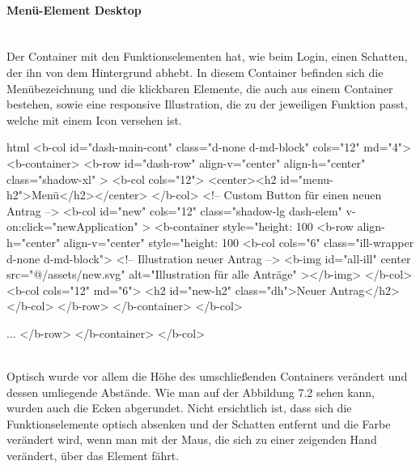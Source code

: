 \paragraph{Menü-Element Desktop}
~\\
Der Container mit den Funktionselementen hat, wie beim Login, einen Schatten, der ihn von dem Hintergrund abhebt. In diesem Container befinden sich die Menübezeichnung und die klickbaren Elemente, die auch aus einem Container bestehen, sowie eine responsive Illustration, die zu der jeweiligen Funktion passt, welche mit einem Icon versehen ist. 
\begin{code}{html}
<b-col id="dash-main-cont" class="d-none d-md-block" cols="12" md="4">
	<b-container>
		<b-row
			id="dash-row"
			align-v="center"
			align-h="center"
			class="shadow-xl"
		>
			<b-col cols="12">
				<center><h2 id="menu-h2">Menü</h2></center>
			</b-col>
			<!-- Custom Button für einen neuen Antrag -->
			<b-col
				id="new"
				cols="12"
				class="shadow-lg dash-elem"
				v-on:click="newApplication"
			>
				<b-container style="height: 100%
					<b-row align-h="center" align-v="center" style="height: 100%
						<b-col cols="6" class="ill-wrapper d-none d-md-block">
						<!-- Illustration neuer Antrag -->
							<b-img
								id="all-ill"
								center
								src="@/assets/new.svg"
								alt="Illustration für alle Anträge"
							></b-img>
						</b-col>
						<b-col cols="12" md="6">
							<h2 id="new-h2" class="dh">Neuer Antrag</h2>
						</b-col>
					</b-row>
				</b-container>
			</b-col>
			
			...
		</b-row>
	</b-container>
</b-col>
\end{code}
	\label{list:menuhtml} ~\\
Optisch wurde vor allem die Höhe des umschließenden Containers verändert und dessen umliegende Abstände. Wie man auf der Abbildung 7.2 sehen kann, wurden auch die Ecken abgerundet. Nicht ersichtlich ist, dass sich die Funktionselemente optisch absenken und der Schatten entfernt und die Farbe verändert wird, wenn man mit der Maus, die sich zu einer zeigenden Hand verändert, über das Element fährt. 
	\label{list:cssmenu} ~\\
